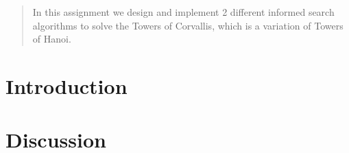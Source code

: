 \documentclass[12pt]{article}
\begin{document}
\maketitle

\begin{abstract}
In this assignment we design and implement 2 different informed search algorithms to solve the Towers of Corvallis, which is a variation of Towers of Hanoi. 
\end{abstract}

\section{Introduction}






\section{Discussion}




\end{document}
